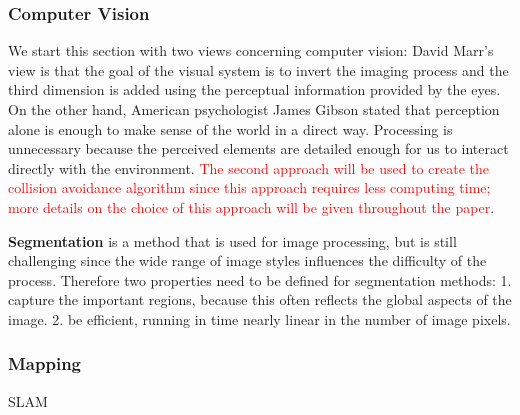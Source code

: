 \subsubsection{Computer Vision}
We start this section with two views concerning computer vision: David Marr's view is that the goal of the visual system is to invert the imaging process and the third dimension is added using the perceptual information provided by the eyes. On the other hand, American psychologist James Gibson stated that perception alone is enough to make sense of the world in a direct way. Processing is unnecessary because the perceived elements are detailed enough for us to interact directly with the environment. \textcolor{red}{The second approach will be used to create the collision avoidance algorithm since this approach requires less computing time; more details on the choice of this approach will be given throughout the paper}.

\textbf{Segmentation} is a method that is used for image processing, but is still challenging since the wide range of image styles influences the difficulty of the process. Therefore two properties need to be defined for segmentation methods: 1. capture the important regions, because this often reflects the global aspects of the image. 2. be efficient, running in time nearly linear in the number of image pixels.
\subsubsection{Mapping} SLAM

